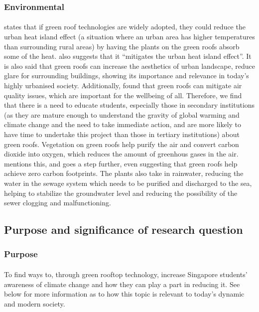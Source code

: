\documentclass{article}
\begin{document}
\begin{multicols}{2}
  \subsubsection{Environmental}
  \paragraph{} \cite{energeff} states that if green roof technologies
  are widely adopted, they could reduce the urban heat island effect (a
    situation where an urban area has higher temperatures than surrounding
  rural areas) by having the plants on the green roofs absorb some of the
  heat. \cite{HKGreenRoofGL} also suggests that it ``mitigates the urban
  heat island effect''. It is also said that green roofs can increase the
  aesthetics of urban landscape, reduce glare for surrounding buildings,
  showing its importance and relevance in today's highly urbanised
  society. Additionally, \cite{HKGreenRoofGL} found that green roofs
  can mitigate air quality issues, which are important for the wellbeing
  of all. Therefore, we find that there is a need to educate students,
  especially those in secondary institutions (as they are mature enough to
    understand the gravity of global warming and climate change and the need
    to take immediate action, and are more likely to have time to undertake
  this project than those in tertiary institutions) about green roofs.
  Vegetation on green roofs help purify the air and convert carbon
  dioxide into oxygen, which reduces the amount of greenhous gases in
  the air. \parencite{energeff} mentions this, and \cite{CommAwareGBSyd}
  goes a step further, even suggesting that green roofs help achieve zero
  carbon footprints. The plants also take in rainwater, reducing the
  water in the sewage system which needs to be purified and discharged
  to the sea, helping to stabilize the groundwater level and reducing
  the possibility of the sewer clogging and malfunctioning.



  \subsection{Purpose and significance of research question}
  \subsubsection{Purpose}
  \paragraph{} To find ways to, through green rooftop technology, increase
  Singapore students' awareness of climate change and how they can play
  a part in reducing it. See below for more information as to how this
  topic is relevant to today's dynamic and modern society.


\end{multicols}
\end{document}
